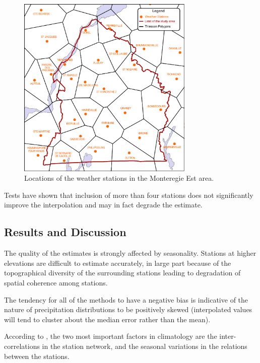 \documentclass[TechnicalNoteMeteo.tex]{subfiles}
\begin{document}
\begin{figure}
\centering
\includegraphics[width=0.75\textwidth]{img/Thiessen_meteo}
\caption[Locations of the weather stations in the Monteregie Est area.]{Locations of the weather stations in the Monteregie Est area.}
\label{fig:Thiessen_meteo}
\end{figure}


Tests have shown that inclusion of more than four stations does not significantly improve the interpolation and may in fact degrade the estimate. 

\subsection{Results and Discussion}

The quality of the estimates is strongly affected by seasonality. Stations at higher elevations are difficult to estimate accurately, in large part because of the topographical diversity of the surrounding stations leading to degradation of spatial coherence among stations.

The tendency for all of the methods to have a negative bias is indicative of the nature of precipitation distributions to be positively skewed (interpolated values will tend to cluster about the median error rather than the mean).

According to \cite{xia_forest_1999}, the two most important factors in climatology are the inter-correlations in the station network, and the seasonal variations in the relations between the stations.
\end{document}
